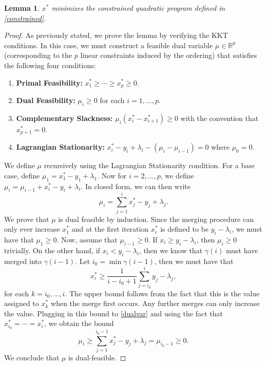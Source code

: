 \documentclass{uwstat572}
\newtheorem{lemma}[theorem]{Lemma}
\theoremstyle{remark}
\theoremstyle{definition}
\begin{document}
\begin{lemma}\label{alg2correct}
$x^*$ minimizes the constrained quadratic program defined in \eqref{constrained}.
\end{lemma}
\begin{proof}
As previously stated, we prove the lemma by verifying the KKT conditions.  In this case, we must construct a feasible dual variable $\mu \in \mathbb{R}^p$ (corresponding to the $p$ linear constraints induced by the ordering) that satisfies the following four conditions:
\begin{enumerate}
\item \textbf{Primal Feasibility:} $x_1^* \geq \cdots \geq x_p^* \geq 0$.
\item \textbf{Dual Feasibility:} $\mu_i \geq 0$ for each $i = 1,...,p$.
\item \textbf{Complementary Slackness:} $\mu_i(x^*_{i} - x^*_{i+1}) \geq 0$ with the convention that $x^*_{p+1} = 0$.
\item \textbf{Lagrangian Stationarity:} $x_i^{*} - y_i + \lambda_{i} - (\mu_i - \mu_{i-1}) = 0$ where $\mu_0 = 0$.
\end{enumerate}
We define $\mu$ recursively using the Lagrangian Stationarity condition.  For a base case, define $\mu_1 = x_1^* - y_1 + \lambda_1$.  Now for $i =2,...,p$, we define $\mu_i = \mu_{i-1} + x_i^* - y_i + \lambda_i$.  In closed form, we can then write
\begin{equation}\label{dualvar}
\mu_i = \sum_{j=1}^i x_j^* - y_j + \lambda_j.
\end{equation}
We prove that $\mu$ is dual feasible by induction. Since the merging procedure can only ever increase $x_1^*$ and at the first iteration $x_i^*$ is defined to be $y_i - \lambda_i$, we must have that $\mu_1 \geq 0$.  Now, assume that $\mu_{i-1} \geq 0$.  If $x_i \geq y_i - \lambda_i$, then $\mu_{i} \geq 0$ trivially.  On the other hand, if $x_i < y_i - \lambda_i$, then we know that $\gamma(i)$ must have merged into $\gamma(i-1)$.  Let $i_0 = \min \gamma(i-1)$, then we must have that
\begin{equation*}
    x_i^* \geq \frac{1}{i - i_0 + 1} \sum_{j=i_0}^i y_j - \lambda_j,
\end{equation*}
for each $k=i_0,...,i$.  The upper bound follows from the fact that this is the value assigned to $x_k^*$ when the merge first occurs.  Any further merges can only increase the value.  Plugging in this bound to \eqref{dualvar} and using the fact that $x_{i_0}^* = \cdots = x_i^*$, we obtain the bound
\begin{equation}
\mu_i \geq \sum_{j=1}^{i_0 -1} x_j^* - y_j + \lambda_j = \mu_{i_0 - 1} \geq 0.
\end{equation}
We conclude that $\mu$ is dual-feasible.  


\end{proof}
\end{document}

